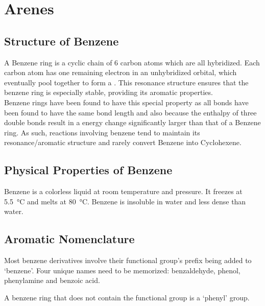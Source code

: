 \documentclass[../main]{subfiles}
\begin{document}
\section{Arenes}

	\subsection{Structure of Benzene}

	A Benzene ring is a cyclic chain of 6 carbon atoms which are all  hybridized. Each carbon atom has one remaining electron in an unhybridized  orbital, which eventually pool together to form a . This resonance structure ensures that the benzene ring is especially stable, providing its aromatic properties. \\

	Benzene rings have been found to have this special property as all  bonds have been found to have the same bond length and also because the enthalpy of three  double bonds result in a energy change significantly larger than that of a Benzene ring. As such, reactions involving benzene tend to maintain its resonance/aromatic structure and rarely convert Benzene into Cyclohexene.

	\subsection{Physical Properties of Benzene}

	Benzene is a colorless liquid at room temperature and pressure. It freezes at \SI{5.5}{\celsius} and melts at \SI{80}{\celsius}. Benzene is insoluble in water and less dense than water.

	\subsection{Aromatic Nomenclature}

	Most benzene derivatives involve their functional group's prefix being added to `benzene'. Four unique names need to be memorized: benzaldehyde, phenol, phenylamine and benzoic acid.


	A benzene ring that does not contain the functional group is a `phenyl' group.

\end{document}

